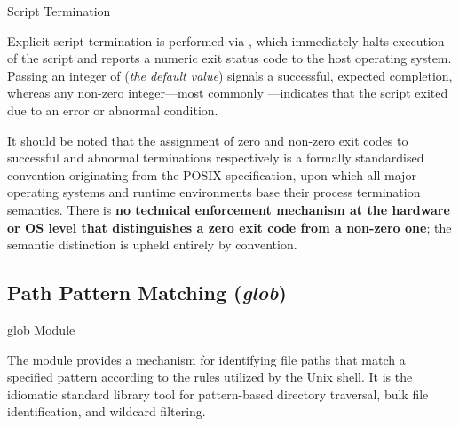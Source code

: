 \documentclass[10pt]{article}
\begin{document}
    \begin{core}{Script Termination}

      Explicit script termination is performed via , which immediately halts execution of the script and reports a numeric exit status code to the host operating system. Passing an integer of  (\textit{the default value}) signals a successful, expected completion, whereas any non-zero integer---most commonly ---indicates that the script exited due to an error or abnormal condition.

      It should be noted that the assignment of zero and non-zero exit codes to successful and abnormal terminations respectively is a formally standardised convention originating from the POSIX specification, upon which all major operating systems and runtime environments base their process termination semantics. There is \textbf{no technical enforcement mechanism at the hardware or OS level that distinguishes a zero exit code from a non-zero one}; the semantic distinction is upheld entirely by convention.

    \end{core}

  \subsection{Path Pattern Matching (\textit{glob})}

    \begin{core}{glob Module}

      The \href{https://docs.python.org/3/library/glob.html}{} module provides a mechanism for identifying file paths that match a specified pattern according to the rules utilized by the Unix shell. It is the idiomatic standard library tool for pattern-based directory traversal, bulk file identification, and wildcard filtering.

    \end{core}
\end{document}
